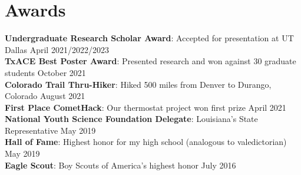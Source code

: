 \documentclass[letterpaper,11pt]{article}
\begin{document}
\section{Awards}
 \begin{itemize}[leftmargin=0.15in, label={}]
    \small{\item{
     \textbf{Undergraduate Research Scholar Award}{: Accepted for presentation at UT Dallas} \hspace{45 pt}April 2021/2022/2023 \\
     \textbf{TxACE Best Poster Award}{: Presented research and won against 30 graduate students} \hspace{70 pt}October 2021\\
     \textbf{Colorado Trail Thru-Hiker}{: Hiked 500 miles from Denver to Durango, Colorado} \hspace{103 pt}August 2021\\
     \textbf{First Place CometHack}{: Our thermostat project won first prize} \hspace{186 pt}April 2021\\
     \textbf{National Youth Science Foundation Delegate}{: Louisiana's State Representative} \hspace{106 pt}May 2019\\
     \textbf{Hall of Fame}{: Highest honor for my high school (analogous to valedictorian)} \hspace{138 pt}May 2019\\
     \textbf{Eagle Scout}{: Boy Scouts of America's highest honor} \hspace{246 pt}July 2016
    }}
 \end{itemize}
\end{document}
